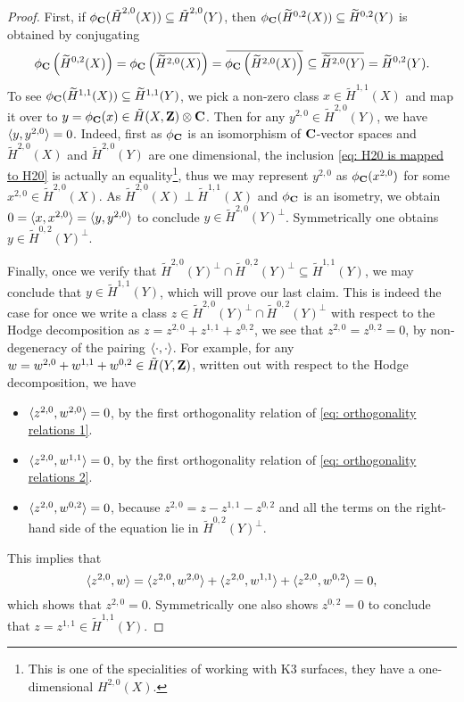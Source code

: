 \begin{proof}
    First, if $\phi_\mathbf C(\,\tilde{\!{H}}^{2,0}(X)) \subseteq \,\tilde{\!{H}}^{2,0}(Y)$, then $\phi_\mathbf C(\widetilde{H}^{0,2}(X)) \subseteq \widetilde{H}^{0,2}(Y)$ is obtained by conjugating
    \[
        \phi_\C\left(\widetilde{H}^{0,2}(X)\right) = \phi_\C\left(\ols{\widetilde{H}^{2,0}(X)}\right) = \ols{\phi_\C\left(\widetilde{H}^{2,0}(X)\right)} \subseteq \ols{\widetilde{H}^{2,0}(Y)} = \widetilde{H}^{0,2}(Y).
    \]
    To see $\phi_\mathbf C(\widetilde{H}^{1,1}(X)) \subseteq \widetilde{H}^{1,1}(Y)$, we pick a non-zero class $x \in \widetilde{H}^{1,1}(X)$ and map it over to $y = \phi_\mathbf C(x) \in \,\tilde{\!{H}}(X, \mathbf Z) \otimes \mathbf C$. Then for any $y^{2,0} \in \widetilde{H}^{2,0}(Y)$, we have $\langle y, y^{2,0} \rangle = 0$. Indeed, first as $\phi_\mathbf C$ is an isomorphism of $\mathbf C$-vector spaces and $\widetilde{H}^{2,0}(X)$ and $\widetilde{H}^{2,0}(Y)$ are one dimensional, the inclusion \eqref{eq: H20 is mapped to H20} is actually an equality\footnote{
        This is one of the specialities of working with K3 surfaces, they have a one-dimensional $H^{2,0}(X)$.
    }, thus we may represent $y^{2,0}$ as $\phi_\mathbf C(x^{2,0})$ for some $x^{2,0} \in \widetilde{H}^{2,0}(X)$. As $\widetilde{H}^{2,0}(X) \perp \widetilde{H}^{1,1}(X)$ and $\phi_\mathbf C$ is an isometry, we obtain $0 = \langle x, x^{2,0} \rangle = \langle y, y^{2,0} \rangle$ to conclude $y \in \widetilde{H}^{2,0}(Y)^\perp$. Symmetrically one obtains $y \in \widetilde{H}^{0,2}(Y)^\perp$. 

    Finally, once we verify that $\widetilde{H}^{2,0}(Y)^\perp \cap \widetilde{H}^{0,2}(Y)^\perp \subseteq \widetilde{H}^{1,1}(Y)$, we may conclude that $y \in \widetilde{H}^{1,1}(Y)$, which will prove our last claim.
    This is indeed the case for once we write a class $z \in \widetilde{H}^{2,0}(Y)^\perp \cap \widetilde{H}^{0,2}(Y)^\perp$ with respect to the Hodge decomposition as $z = z^{2,0} + z^{1,1} + z^{0,2}$, we see that $z^{2,0} = z^{0,2} = 0$, by non-degeneracy of the pairing $\langle \cdot, \cdot \rangle$. For example, for any $w = w^{2,0} + w^{1,1} + w^{0,2} \in \,\tilde{\!{H}}(Y, \mathbf Z)$, written out with respect to the Hodge decomposition, we have 
    \begin{itemize}[label = $\circ$ ]
        \item{$\langle z^{2,0}, w^{2,0} \rangle = 0$, by the first orthogonality relation of \eqref{eq: orthogonality relations 1}.
        }
        \item{
            $\langle z^{2,0}, w^{1,1} \rangle = 0$, by the first orthogonality relation of \eqref{eq: orthogonality relations 2}.
        }
        \item{
            $\langle z^{2,0}, w^{0,2} \rangle = 0$, because $z^{2,0} = z - z^{1,1} - z^{0,2}$ and all the terms on the right-hand side of the equation lie in $\widetilde{H}^{0,2}(Y)^\perp$.
        }
    \end{itemize}
    This implies that
    \[
        \langle z^{2,0}, w \rangle = \langle z^{2,0}, w^{2,0} \rangle + \langle z^{2,0}, w^{1,1} \rangle + \langle z^{2,0}, w^{0,2} \rangle = 0,
    \]
    which shows that $z^{2,0} = 0$. Symmetrically one also shows $z^{0,2} = 0$ to conclude that $z = z^{1,1} \in \widetilde{H}^{1,1}(Y)$. \qedhere
\end{proof}

